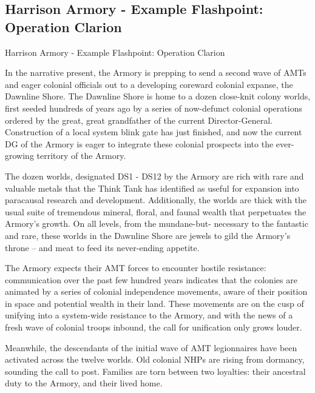 \subsection{Harrison Armory - Example Flashpoint: Operation Clarion  }
Harrison Armory - Example Flashpoint: Operation Clarion  

In the narrative present, the Armory is prepping to send a second wave of AMTs and eager  
colonial officials out to a developing coreward colonial expanse, the Dawnline Shore. The  
Dawnline Shore is home to a dozen close-knit colony worlds, first seeded hundreds of years ago  
by a series of now-defunct colonial operations ordered by the great, great grandfather of the  
current Director-General. Construction of a local system blink gate has just finished, and now the  
current DG of the Armory is eager to integrate these colonial prospects into the ever-growing  
territory of the Armory. 
 

                                                                                                           


The dozen worlds, designated DS1 - DS12 by the Armory are rich with rare and valuable metals  
that the Think Tank has identified as useful for expansion into paracausal research and  
development. Additionally, the worlds are thick with the usual suite of tremendous mineral, floral,  
and faunal wealth that perpetuates the Armory’s growth. On all levels, from the mundane-but- 
necessary to the fantastic and rare, these worlds in the Dawnline Shore are jewels to gild the  
Armory’s throne -- and meat to feed its never-ending appetite.
 

The Armory expects their AMT forces to encounter hostile resistance: communication over the  
past few hundred years indicates that the colonies are animated by a series of colonial  
independence movements, aware of their position in space and potential wealth in their land.  
These movements are on the cusp of unifying into a system-wide resistance to the Armory, and  
with the news of a fresh wave of colonial troops inbound, the call for unification only grows  
louder. 
 

Meanwhile, the descendants of the initial wave of AMT legionnaires have been activated across  
the twelve worlds. Old colonial NHPs are rising from dormancy, sounding the call to post.  
Families are torn between two loyalties: their ancestral duty to the Armory, and their lived home.  
 

